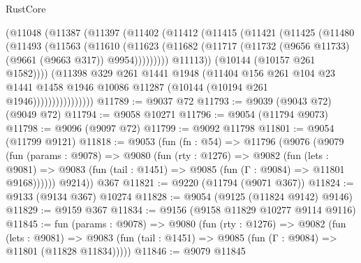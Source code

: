 \begin{lexlean}{RustCore}
\begin{coremodule}
                      (@11048
                        (@11387
                          (@11397
                            (@11402
                              (@11412
                                (@11415
                                  (@11421
                                    (@11425
                                      (@11480
                                        (@11493
                                          (@11563
                                            (@11610
                                              (@11623
                                                (@11682
                                                  (@11717
                                                    (@11732
                                                      (@9656 @11733)
                                                      (@9661 (@9663 @317))
                                                      @9954)))))))))
                                    @11113))
                                (@10144 (@10157 @261 @1582))))
                            (@11398
                              @329
                              @261
                              @1441
                              @1948
                              (@11404
                                @156
                                @261
                                @104
                                @23
                                @1441
                                @1458
                                @1946
                                @10086
                                @11287
                                (@10144 (@10194 @261 @1946))))))))))))))))
@11789 := @9037 @72
@11793 := @9039 (@9043 @72) (@9049 @72)
@11794 := @9058 @10271
@11796 := @9054 (@11794 @9073)
@11798 := @9096 (@9097 @72)
@11799 := @9092 @11798
@11801 := @9054 (@11799 @9121)
@11818 := @9053
    (fun (fn : @54) =>
    @11796
      (@9076
        (@9079
          (fun (params : @9078) =>
          @9080
            (fun (rty : @1276) =>
            @9082
              (fun (lets : @9081) =>
              @9083 (fun (tail : @1451) => @9085 (fun (Γ : @9084) => @11801 @9168))))))
        @9214))
    @367
@11821 := @9220 (@11794 (@9071 @367))
@11824 := @9133 (@9134 @367) @10274
@11828 := @9054 (@9125 (@11824 @9142) @9146)
@11829 := @9159 @367
@11834 := @9156 (@9158 @11829 @10277 @9114 @9116)
@11845 := fun (params : @9078) =>
  @9080
    (fun (rty : @1276) =>
    @9082
      (fun (lets : @9081) =>
      @9083 (fun (tail : @1451) => @9085 (fun (Γ : @9084) => @11801 (@11828 @11834)))))
@11846 := @9079 @11845

\end{coremodule}
\end{lexlean}
